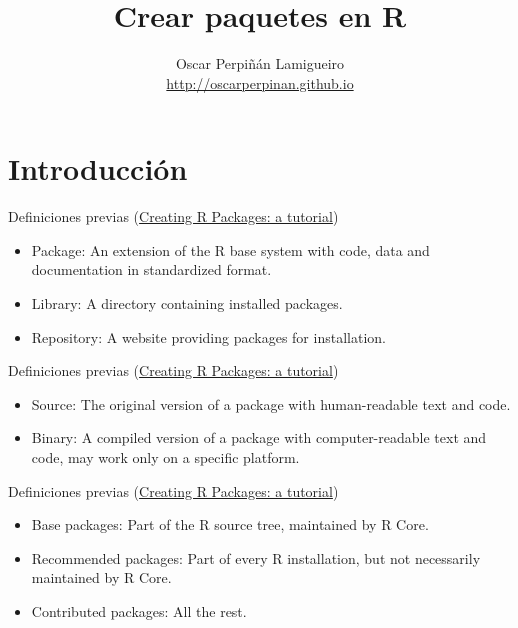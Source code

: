 \documentclass[xcolor={usenames,svgnames,dvipsnames}]{beamer}
\author{Oscar Perpiñán Lamigueiro \\ \url{http://oscarperpinan.github.io}}
\date{}
\title{Crear paquetes en R}
\begin{document}
\maketitle


\section{Introducción}
\label{sec:orgefbf7bc}

\begin{frame}[label={sec:org39d934b}]{Definiciones previas (\href{http://cran.r-project.org/doc/contrib/Leisch-CreatingPackages.pdf}{Creating R Packages: a tutorial})}
\begin{itemize}
\item \alert{Package}: An extension of the R base system with code, data and
documentation in standardized format.
\item \alert{Library}: A directory containing installed packages.
\item \alert{Repository}: A website providing packages for installation.
\end{itemize}
\end{frame}

\begin{frame}[label={sec:org3cb8bbf}]{Definiciones previas (\href{http://cran.r-project.org/doc/contrib/Leisch-CreatingPackages.pdf}{Creating R Packages: a tutorial})}
\begin{itemize}
\item \alert{Source}: The original version of a package with human-readable text and code.
\item \alert{Binary}: A compiled version of a package with computer-readable
text and code, may work only on a specific platform.
\end{itemize}
\end{frame}

\begin{frame}[label={sec:orge87e86f}]{Definiciones previas (\href{http://cran.r-project.org/doc/contrib/Leisch-CreatingPackages.pdf}{Creating R Packages: a tutorial})}
\begin{itemize}
\item \alert{Base packages}: Part of the R source tree, maintained by R Core.
\item \alert{Recommended packages}: Part of every R installation, but not
necessarily maintained by R Core.
\item \alert{Contributed packages}: All the rest.
\end{itemize}
\end{frame}
\end{document}
